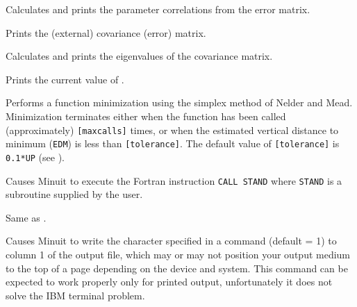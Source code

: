 
Calculates and prints the parameter correlations from the error matrix.


Prints the (external) covariance (error) matrix.


Calculates and prints the eigenvalues of the covariance matrix.


Prints the current value of .


Performs a function minimization using the simplex method of Nelder and
Mead. Minimization terminates either when the function has been called
(approximately) \texttt{[maxcalls]} times, or when the estimated vertical
distance to minimum (\texttt{EDM}) is less than \texttt{[tolerance]}. 
The default value of \texttt{[tolerance]} is \texttt{0.1*UP} 
(see ).


Causes Minuit to execute the Fortran instruction \texttt{CALL STAND}
where \texttt{STAND} is a subroutine supplied by the user.


Same as .


Causes Minuit to write the character specified in a
 command (default = 1) to column 1 of the
output file, which may or may not position your output medium
to the top of a page depending on the device and system.
This command can be expected to work properly only for printed
output, unfortunately it does not solve the IBM terminal problem.
